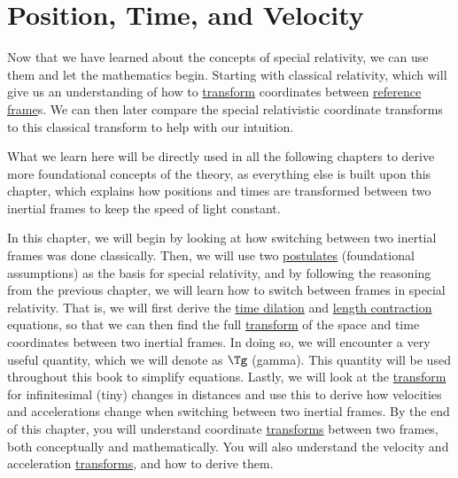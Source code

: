 \chapter{Position, Time, and Velocity} \label{ch: Position, Time and Velocity} %

Now that we have learned about the concepts of special relativity, we can use them and let the mathematics begin.
Starting with classical relativity, which will give us an understanding of how to \hyperlink{def-transform}{transform} coordinates between \hyperlink{def-Reference-frame}{reference frame}s.
We can then later compare the special relativistic coordinate transforms to this classical transform to help with our intuition.

What we learn here will be directly used in all the following chapters to derive more foundational concepts of the theory, as everything else is built upon this chapter, which explains how positions and times are transformed between two inertial frames to keep the speed of light constant.

In this chapter, we will begin by looking at how switching between two inertial frames was done classically.
Then, we will use two \hyperlink{def-postulates}{postulates} (foundational assumptions) as the basis for special relativity, and by following the reasoning from the previous chapter, we will learn how to switch between frames in special relativity.
That is, we will first derive the \hyperlink{def-time-dilation}{time dilation} and \hyperlink{def-length-contraction}{length contraction} equations, so that we can then find the full \hyperlink{def-transform}{transform} of the space and time coordinates between two inertial frames.
In doing so, we will encounter a very useful quantity, which we will denote as ${\Tg }$ (gamma).
This quantity will be used throughout this book to simplify equations.
Lastly, we will look at the \hyperlink{def-transform}{transform} for infinitesimal (tiny) changes  in distances and use this to derive how velocities and accelerations change when switching between two inertial frames.
By the end of this chapter, you will understand coordinate \hyperlink{def-transform}{transforms} between two frames, both conceptually and mathematically.
You will also understand the velocity and acceleration \hyperlink{def-transform}{transforms}, and how to derive them.

